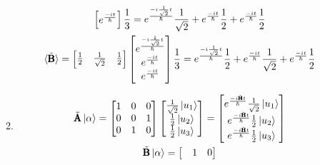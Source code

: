 \documentclass[12pt]{article}
\newcommand{\OP}[1]{\tilde{\pmb{\text{#1}}}}
\begin{document}
\begin{enumerate}
\begin{enumerate}
\begin{gather*}
\begin{bmatrix}
                    e^{\frac{-it}{\hbar}}
                \end{bmatrix}\frac{1}{3}=e^{\frac{-i\frac{1}{\sqrt{2}}t}{\hbar}}\frac{1}{\sqrt{2}}+e^{\frac{-it}{\hbar}} \frac{1}{2} +e^{\frac{-it}{\hbar}}  \frac{1}{2}\\
                \braket{\OP{B}}=
                \begin{bmatrix}
                    \frac{1}{2} & \frac{1}{\sqrt{2}}& \frac{1}{2}
                \end{bmatrix}
                \begin{bmatrix}
                    e^{\frac{-i\frac{1}{\sqrt{2}}t}{\hbar}} \\
                    e^{\frac{-it}{\hbar}}                   \\
                    e^{\frac{-it}{\hbar}}
                \end{bmatrix}\frac{1}{3}=e^{\frac{-i\frac{1}{\sqrt{2}}t}{\hbar}}\frac{1}{2}+e^{\frac{-it}{\hbar}} \frac{1}{\sqrt{2}} +e^{\frac{-it}{\hbar}}  \frac{1}{2}
            \end{gather*}
            \item
            \begin{gather*}
                \OP{A}\ket{\alpha}=
                \begin{bmatrix}
                    1 & 0 & 0 \\
                    0 & 0 & 1 \\
                    0 & 1 & 0
                \end{bmatrix}
                \begin{bmatrix}
                    \frac{1}{\sqrt{2}}\ket{u_1} \\
                    \frac{1}{2}\ket{u_2}        \\
                    \frac{1}{2}\ket{u_3}
                \end{bmatrix}
                =
                \begin{bmatrix}
                    e^{\frac{-i\OP{H}t}{\hbar}}\frac{1}{\sqrt{2}}\ket{u_1} \\
                    e^{\frac{-i\OP{H}t}{\hbar}}\frac{1}{2}\ket{u_2}        \\
                    e^{\frac{-i\OP{H}t}{\hbar}}\frac{1}{2}\ket{u_3}
                \end{bmatrix}\\
                \OP{B}\ket{\alpha}=
                \begin{bmatrix}
                    & 1 & 0 \\

\end{bmatrix}
\end{gather*}
\end{enumerate}
\end{enumerate}
\end{document}
